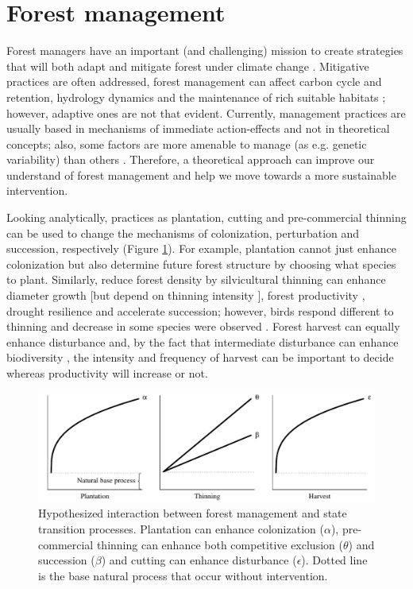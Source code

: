 \section{Forest management}

Forest managers have an important (and challenging) mission to create strategies that will both adapt and mitigate forest under climate change \parencite{Millar2007}.
Mitigative practices are often addressed, forest management can affect carbon cycle and retention, hydrology dynamics and the maintenance of rich suitable habitats \parencite{Becknell2015}; however, adaptive ones are not that evident.
Currently, management practices are usually based in mechanisms of immediate action-effects and not in theoretical concepts; also, some factors are more amenable to manage (as e.g. genetic variability) than others \parencite[e.g. individual sensitivity, presence of alternative stable states;][]{Oliver2015}.
Therefore, a theoretical approach can improve our understand of forest management and help we move towards a more sustainable intervention.

Looking analytically, practices as plantation, cutting and pre-commercial thinning can be used to change the mechanisms of colonization, perturbation and succession, respectively (Figure \ref{fig:fig2}).
For example, plantation cannot just enhance colonization but also determine future forest structure by choosing what species to plant.
Similarly, reduce forest density by silvicultural thinning can enhance diameter growth \parencite{Rytter2014} [but depend on thinning intensity \parencite{Olivar2014,Fuller2013}], forest productivity \parencite{Chase2016a}, drought resilience \parencite{Bottero2017,Sohn2013} and accelerate succession; however, birds respond different to thinning and decrease in some species were observed \parencite{Hayes2003}.
Forest harvest can equally enhance disturbance and, by the fact that intermediate disturbance can enhance biodiversity \parencite{Grime1973,Horn1975,Connell1978}, the intensity and frequency of harvest can be important to decide whereas productivity will increase or not.

\begin{figure}
    \centering
    \includegraphics[width=1\textwidth]{img/fig2.pdf}
    \caption{Hypothesized interaction between forest management and state transition processes. Plantation can enhance colonization ($\alpha$), pre-commercial thinning can enhance both competitive exclusion ($\theta$) and succession ($\beta$) and cutting can enhance disturbance ($\epsilon$). Dotted line is the base natural process that occur without intervention.}
    \label{fig:fig2}
\end{figure}

